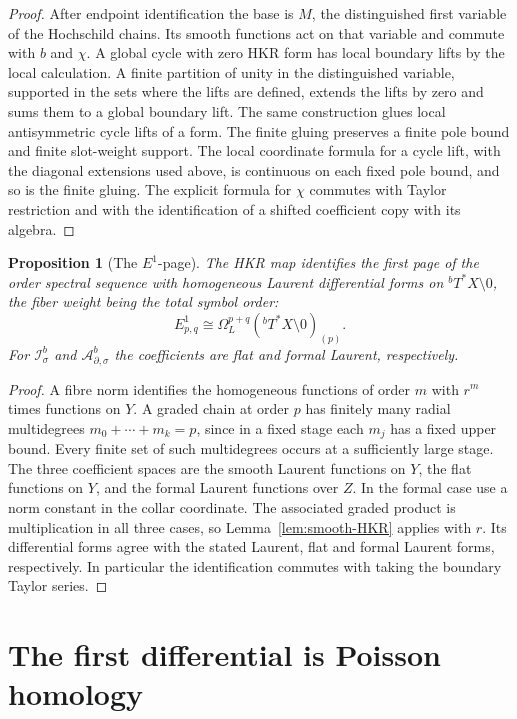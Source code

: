 \documentclass[11pt,oneside,reqno]{article}
\newcommand{\Tbstar}{{}^{b}T^*X}
\newcommand{\Isb}{\mathcal I^b_\sigma}
\newcommand{\Adsb}{\mathcal A^b_{\partial,\sigma}}
\theoremstyle{plain}
\newtheorem{proposition}[theorem]{Proposition}
\theoremstyle{definition}
\theoremstyle{remark}
\begin{document}
\begin{proof}
After endpoint identification the base is \(M\), the distinguished
first variable of the Hochschild chains. Its smooth functions
act on that variable and commute with \(b\) and \(\chi\).
A global cycle with zero HKR form has local boundary lifts by
the local calculation. A finite partition of unity in the
distinguished variable, supported in the sets where the lifts
are defined, extends the lifts by zero and sums them to a global
boundary lift. The same construction glues local antisymmetric
cycle lifts of a form. The finite gluing preserves a finite
pole bound and finite slot-weight support. The local coordinate
formula for a cycle lift, with the diagonal extensions used above,
is continuous on each fixed pole bound, and so is the finite gluing.
The explicit formula
for \(\chi\) commutes with Taylor restriction and with the
identification of a shifted coefficient copy with its algebra.
\end{proof}

\begin{proposition}[The \(E^1\)-page]\label{prop:E1}
The HKR map identifies the first page of the order spectral sequence with
homogeneous Laurent differential forms on \(\Tbstar\setminus0\), the fiber
weight being the total symbol order:
\[
 E^1_{p,q}\cong\Omega_L^{p+q}(\Tbstar\setminus0)_{(p)} .
\]
For \(\Isb\) and \(\Adsb\) the coefficients are flat and formal
Laurent, respectively.
\end{proposition}

\begin{proof}
A fibre norm identifies the homogeneous functions of order \(m\) with
\(r^m\) times functions on \(Y\). A graded chain at order \(p\)
has finitely many radial multidegrees \(m_0+\cdots+m_k=p\), since in
a fixed stage each \(m_j\) has a fixed upper bound. Every finite
set of such multidegrees occurs at a sufficiently large stage.
The three coefficient spaces are the smooth Laurent functions on
\(Y\), the flat functions on \(Y\), and the formal Laurent functions
over \(Z\). In the formal case use a norm constant in the collar
coordinate. The associated graded product is multiplication in all
three cases, so Lemma~\ref{lem:smooth-HKR} applies with \(r\).
Its differential forms agree with the stated Laurent, flat and
formal Laurent forms, respectively. In particular the identification
commutes with taking the boundary Taylor series.
\end{proof}

\section{The first differential is Poisson homology}\label{sec:poisson}
\end{document}
